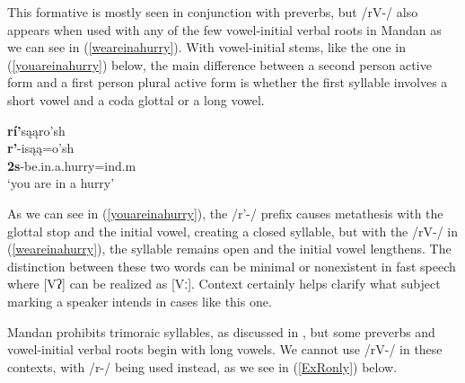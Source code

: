 This formative is mostly seen in conjunction with preverbs, but /rV-/ also appears when used with any of the few vowel-initial verbal roots in Mandan as we can see in (\ref{weareinahurry}). With vowel-initial stems, like the one in (\ref{youareinahurry}) below, the main difference between a second person active form and a first person plural active form is whether the first syllable involves a short vowel and a coda glottal or a long vowel.

\begin{exe}

\item\label{youareinahurry} \glll \textbf{rí'}sąąro'sh\\
	\textbf{r'}-isąą=o'sh\\
	\textbf{2s}-\textnormal{be.in.a.hurry}=ind.m\\
	\glt `you are in a hurry' \citep[92]{hollow1970}

\end{exe}

As we can see in (\ref{youareinahurry}), the /r'-/ prefix causes metathesis with the glottal stop and the initial vowel, creating a closed syllable, but with the /rV-/ in (\ref{weareinahurry}), the syllable remains open and the initial vowel lengthens. The distinction between these two words can be minimal or nonexistent in fast speech where [Vʔ] can be realized as [Vː]. Context certainly helps clarify what subject marking a speaker intends in cases like this one.

\largerpage
Mandan prohibits trimoraic syllables, as discussed in , but some preverbs and vowel-initial verbal roots begin with long vowels. We cannot use /rV-/ in these contexts, with /r-/ being used instead, as we see in (\ref{ExRonly}) below.

